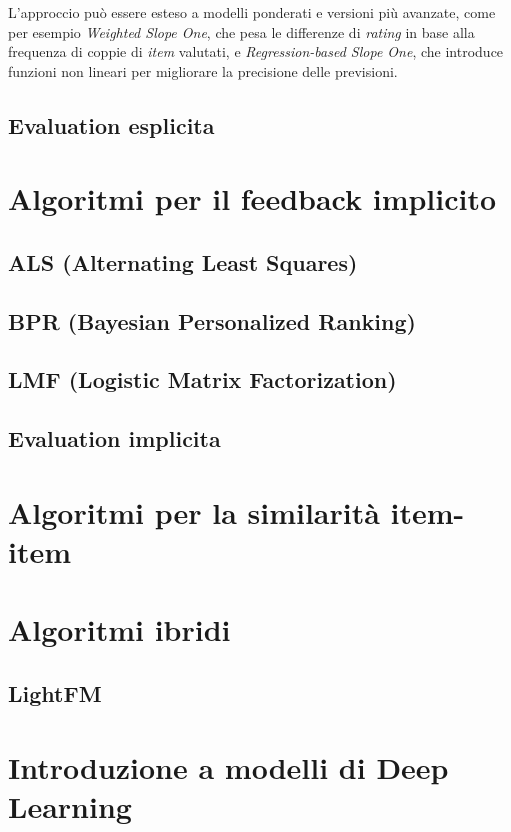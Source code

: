 L'approccio può essere esteso a modelli ponderati e versioni più avanzate, come per esempio \textit{Weighted Slope One}, che pesa le differenze di \textit{rating} in base alla frequenza di coppie di \textit{item} valutati, e \textit{Regression-based Slope One}, che introduce funzioni non lineari per migliorare la precisione delle previsioni.

\subsection{Evaluation esplicita}\label{evaluation-esplicita}

\section{Algoritmi per il feedback implicito}\label{algoritmi-per-feedback-implicito}

\subsection{ALS (Alternating Least Squares)}\label{als-alternating-least-squares}

\subsection{BPR (Bayesian Personalized Ranking)}\label{bpr-bayesian-personalized-ranking}

\subsection{LMF (Logistic Matrix Factorization)}\label{lmf-logistic-matrix-factorization}

\subsection{Evaluation implicita}\label{evaluation-implicita}

\section{Algoritmi per la similarità item-item}\label{algoritmi-per-la-similarita-item-item}

\section{Algoritmi ibridi}\label{algoritmi-ibridi}

\subsection{LightFM}\label{lightfm}

\section{Introduzione a modelli di Deep Learning}\label{introduzione-a-modelli-di-deep-learning}
